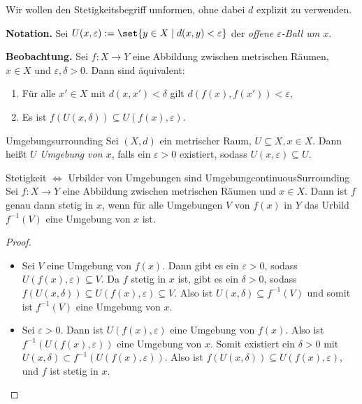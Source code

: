 \documentclass[language=ngerman]{TemplateLecture} %
\begin{document}
Wir wollen den Stetigkeitsbegriff umformen, ohne dabei $d$ explizit zu verwenden.

\textbf{Notation.} Sei $U(x, \varepsilon) := \set{y \in X \mid d(x,y) < \varepsilon}$ der \emph{offene $\varepsilon$-Ball um $x$}.

\textbf{Beobachtung.} Sei $f: X \to Y$ eine Abbildung zwischen metrischen Räumen, $x \in X$ und $\varepsilon, \delta > 0$. Dann sind äquivalent:
\begin{enumerate}[$(i)$]
    \item Für alle $x' \in X$ mit $d(x,x') < \delta$ gilt $d(f(x),f(x')) < \varepsilon$,
    \item Es ist $f(U(x,\delta)) \subseteq U(f(x),\varepsilon)$.
\end{enumerate}

\begin{defi}{Umgebung}{surrounding}
    Sei $(X,d)$ ein metrischer Raum, $U \subseteq X, x \in X$. Dann heißt $U$ \emph{Umgebung von $x$}, falls ein $\varepsilon > 0$ existiert, sodass $U(x, \varepsilon) \subseteq U$.
\end{defi}

\begin{thm}{Stetigkeit $\Leftrightarrow$ Urbilder von Umgebungen sind Umgebung}{continuousSurrounding}
    Sei $f: X \to Y$ eine Abbildung zwischen metrischen Räumen und $x \in X$. Dann ist $f$ genau dann stetig in $x$, wenn für alle Umgebungen $V$ von $f(x)$ in $Y$ das Urbild $f^{-1}(V)$ eine Umgebung von $x$ ist.
\end{thm}
\begin{proof}
    \begin{itemize}
        \item[\enquote{$\Rightarrow$}] Sei $V$ eine Umgebung von $f(x)$. Dann gibt es ein $\varepsilon > 0$, sodass $U(f(x),\varepsilon) \subseteq V$. Da $f$ stetig in $x$ ist, gibt es ein $\delta > 0$, sodass $f(U(x,\delta)) \subseteq U(f(x),\varepsilon) \subseteq V$. Also ist $U(x,\delta) \subseteq f^{-1}(V)$ und somit ist $f^{-1}(V)$ eine Umgebung von $x$.
        \item[\enquote{$\Leftarrow$}] Sei $\varepsilon > 0$. Dann ist $U(f(x),\varepsilon)$ eine Umgebung von $f(x)$. Also ist $f^{-1}(U(f(x),\varepsilon))$ eine Umgebung von $x$. Somit existiert ein $\delta > 0$ mit $U(x,\delta) \subset f^{-1}(U(f(x),\varepsilon))$. Also ist $f(U(x,\delta)) \subseteq U(f(x),\varepsilon)$, und $f$ ist stetig in $x$.
    \end{itemize}
\end{proof}
\end{document}
